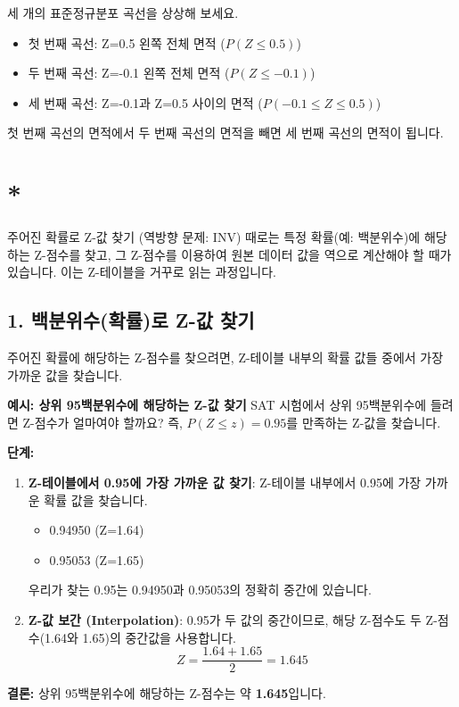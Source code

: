 \documentclass[11pt,a4paper]{article}
\theoremstyle{definition}
\newcommand{\newsection}[1]{\newpage\section{#1}}
\begin{document}
\begin{examplebox}
\begin{tcolorbox}[title=\textbf{시각적 이해}, colback=lightblue!50!white, colframe=darkblue]
세 개의 표준정규분포 곡선을 상상해 보세요.
\begin{itemize}
    \item 첫 번째 곡선: Z=0.5 왼쪽 전체 면적 ($P(Z \le 0.5)$)
    \item 두 번째 곡선: Z=-0.1 왼쪽 전체 면적 ($P(Z \le -0.1)$)
    \item 세 번째 곡선: Z=-0.1과 Z=0.5 사이의 면적 ($P(-0.1 \le Z \le 0.5)$)
\end{itemize}
첫 번째 곡선의 면적에서 두 번째 곡선의 면적을 빼면 세 번째 곡선의 면적이 됩니다.
\end{tcolorbox}
\end{examplebox}

\newsection*{주어진 확률로 Z-값 찾기 (역방향 문제: INV)}
때로는 특정 확률(예: 백분위수)에 해당하는 Z-점수를 찾고, 그 Z-점수를 이용하여 원본 데이터 값을 역으로 계산해야 할 때가 있습니다. 이는 Z-테이블을 거꾸로 읽는 과정입니다.

\subsection{1. 백분위수(확률)로 Z-값 찾기}
주어진 확률에 해당하는 Z-점수를 찾으려면, Z-테이블 내부의 확률 값들 중에서 가장 가까운 값을 찾습니다.

\begin{examplebox}
\textbf{예시: 상위 95백분위수에 해당하는 Z-값 찾기}
SAT 시험에서 상위 95백분위수에 들려면 Z-점수가 얼마여야 할까요? 즉, $P(Z \le z) = 0.95$를 만족하는 Z-값을 찾습니다.

\textbf{단계:}
\begin{enumerate}
    \item \textbf{Z-테이블에서 0.95에 가장 가까운 값 찾기}: Z-테이블 내부에서 0.95에 가장 가까운 확률 값을 찾습니다.
    \begin{itemize}
        \item 0.94950 (Z=1.64)
        \item 0.95053 (Z=1.65)
    \end{itemize}
    우리가 찾는 0.95는 0.94950과 0.95053의 정확히 중간에 있습니다.
    \item \textbf{Z-값 보간 (Interpolation)}: 0.95가 두 값의 중간이므로, 해당 Z-점수도 두 Z-점수(1.64와 1.65)의 중간값을 사용합니다.
    \[ Z = \frac{1.64 + 1.65}{2} = 1.645 \]
\end{enumerate}
\textbf{결론:} 상위 95백분위수에 해당하는 Z-점수는 약 \textbf{1.645}입니다.
\end{examplebox}
\end{document}
